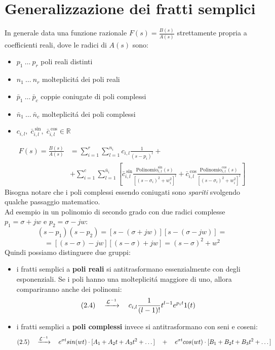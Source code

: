 \documentclass[../main.tex]{subfiles}
\begin{document}
	\section{Generalizzazione dei fratti semplici}
	In generale data una funzione razionale $ F(s) = \frac{B(s)}{A(s)}$ strettamente propria a coefficienti reali, dove le radici di $ A(s) $ sono:
	\begin{itemize}
		\item $ p_1\ \dots\ p_r $ \quad poli reali distinti
		\item $ n_1\ \dots\ n_r $ \quad molteplicit\'{a} dei poli reali
		\item $ \bar{p}_1\ \dots\ \bar{p}_c $ \quad coppie coniugate di poli complessi
		\item $ \bar{n}_1\ \dots\ \bar{n}_c $ \quad molteplicit\'{a} dei poli complessi
		\item $ c_{i,l},\; \bar{c}_{i,l}^{\ \sin},\; \bar{c}_{i,l}^{\ \cos} \in \mathbb{R} $
	\end{itemize}
	\begin{align}
		F(s) = \frac{B(s)}{A(s)} &= \sum_{i=1}^{r} \sum_{l=1}^{n_i} c_{i,l} \frac{1}{(s-p_i)^l} +\\
		&+ \sum_{i=1}^{c} \sum_{l=1}^{\bar{n}_i} \left[ \bar{c}_{i,l}^{\ \sin} \frac{\text{Polinomio}_{i,l}^{\sin}(s)}{[(s - \sigma_i)^2 + w_i^2]^l} + \bar{c}_{i,l}^{\ \cos} \frac{\text{Polinomio}_{i,l}^{\cos}(s)}{[(s - \sigma_i)^2 + w_i^2]^l} \right]
	\end{align}
	Bisogna notare che i poli complessi essendo coniugati sono \textit{spariti} svolgendo qualche passaggio matematico.\\
	Ad esempio in un polinomio di secondo grado con due radici complesse $ p_1 = \sigma + jw $ e $ p_2 = \sigma - jw $:
	\[ (s - p_1)(s - p_2) = [s - (\sigma + jw)][s - (\sigma - jw)] =  \]
	\[ = [(s - \sigma) - jw][(s - \sigma) + jw] = (s - \sigma)^2 + w^2 \]
	Quindi possiamo distinguere due gruppi:
	\begin{itemize}
		\item i fratti semplici a \textbf{poli reali} si antitrasformano essenzialmente con degli esponenziali. Se i poli hanno una molteplicit\'{a} maggiore di uno, allora compariranno anche dei polinomi:
		\[ (2.4) \quad \xrightarrow{\mathcal{L}^{-1}} \quad c_{i,l} \frac{1}{(l-1)!} t^{l-1} e^{p_i t} 1(t) \]
		\item i fratti semplici a \textbf{poli complessi} invece si antitrasformano con seni e coseni:
		\[ (2.5) \quad \xrightarrow{\mathcal{L}^{-1}} \quad e^{\sigma t} sin(wt) \cdot [A_1 + A_2 t + A_3 t^2 + \dots] \quad + \quad e^{\sigma t} cos(wt) \cdot [B_1 + B_2 t + B_3 t^2 + \dots] \]
	\end{itemize}
\end{document}
